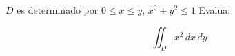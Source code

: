  \( D \) es determinado por \( 0 \leq x \leq y \), \( x^2 + y^2 \leq 1 \) Evalua:

\[
\iint_D x^2 \, dx \, dy
\]

